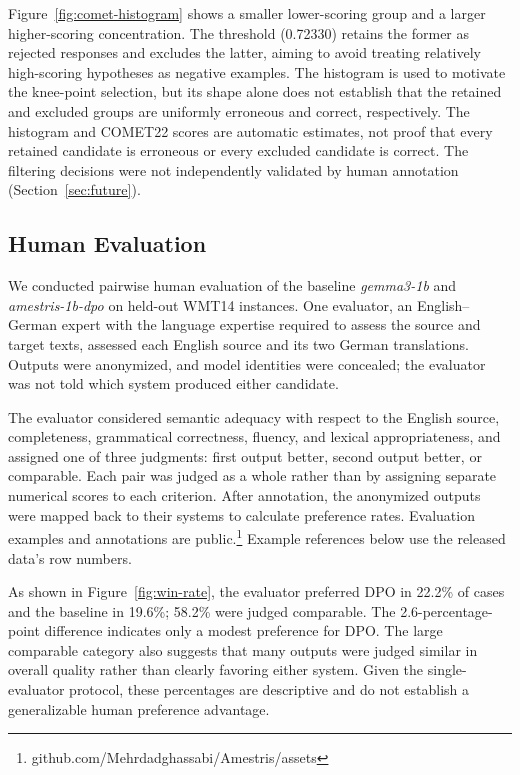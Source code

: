 \documentclass[conference]{IEEEtran}
\begin{document}
Figure~\ref{fig:comet-histogram} shows a smaller lower-scoring group and a larger higher-scoring concentration. The threshold (0.72330) retains the former as rejected responses and excludes the latter, aiming to avoid treating relatively high-scoring hypotheses as negative examples. The histogram is used to motivate the knee-point selection, but its shape alone does not establish that the retained and excluded groups are uniformly erroneous and correct, respectively. The histogram and COMET22 scores are automatic estimates, not proof that every retained candidate is erroneous or every excluded candidate is correct. The filtering decisions were not independently validated by human annotation (Section~\ref{sec:future}).

\subsection{Human Evaluation}
We conducted pairwise human evaluation of the baseline \textit{gemma3-1b} and \textit{amestris-1b-dpo} on held-out WMT14 instances. One evaluator, an English--German expert with the language expertise required to assess the source and target texts, assessed each English source and its two German translations. Outputs were anonymized, and model identities were concealed; the evaluator was not told which system produced either candidate.

The evaluator considered semantic adequacy with respect to the English source, completeness, grammatical correctness, fluency, and lexical appropriateness, and assigned one of three judgments: first output better, second output better, or comparable. Each pair was judged as a whole rather than by assigning separate numerical scores to each criterion. After annotation, the anonymized outputs were mapped back to their systems to calculate preference rates. Evaluation examples and annotations are public.\footnote{github.com/Mehrdadghassabi/Amestris/assets} Example references below use the released data's row numbers.

As shown in Figure~\ref{fig:win-rate}, the evaluator preferred DPO in 22.2\% of cases and the baseline in 19.6\%; 58.2\% were judged comparable. The 2.6-percentage-point difference indicates only a modest preference for DPO. The large comparable category also suggests that many outputs were judged similar in overall quality rather than clearly favoring either system. Given the single-evaluator protocol, these percentages are descriptive and do not establish a generalizable human preference advantage.
\end{document}
